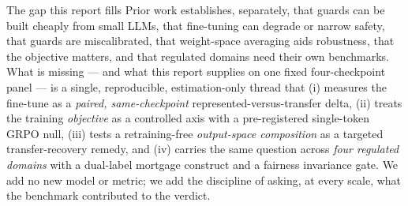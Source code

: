 \begin{takeaway}{The gap this report fills}
Prior work establishes, separately, that guards can be built cheaply from small LLMs, that fine-tuning can
degrade or narrow safety, that guards are miscalibrated, that weight-space averaging aids robustness, that
the objective matters, and that regulated domains need their own benchmarks. What is missing --- and what
this report supplies on one fixed four-checkpoint panel --- is a single, reproducible, estimation-only
thread that (i) measures the fine-tune as a \emph{paired, same-checkpoint} represented-versus-transfer
delta, (ii) treats the training \emph{objective} as a controlled axis with a pre-registered single-token
GRPO null, (iii) tests a retraining-free \emph{output-space composition} as a targeted transfer-recovery
remedy, and (iv) carries the same question across \emph{four regulated domains} with a dual-label mortgage
construct and a fairness invariance gate. We add no new model or metric; we add the discipline of asking,
at every scale, what the benchmark contributed to the verdict.
\end{takeaway}
